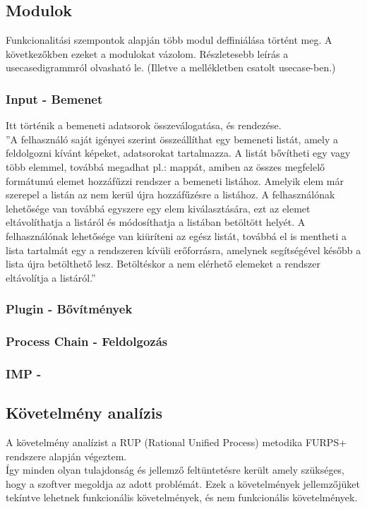 \documentclass[a4paper,12pt,oneside]{report}
\begin{document}
\subsection{Modulok}
Funkcionalitási szempontok alapján több modul deffiniálása történt meg. A következőkben ezeket a modulokat vázolom. Részletesebb leírás a usecasedigrammról olvasható le. (Illetve a mellékletben csatolt usecase-ben.)

\subsubsection{Input - Bemenet}
Itt történik a bemeneti adatsorok összeválogatása, és rendezése.\\
''A felhasználó saját igényei szerint összeállíthat egy bemeneti listát, amely a feldolgozni kívánt képeket, adatsorokat tartalmazza. A listát bővítheti egy vagy több elemmel, továbbá megadhat pl.: mappát, amiben az összes megfelelő formátumú elemet hozzáfűzzi rendszer a bemeneti listához. Amelyik elem már szerepel a listán az nem kerül újra hozzáfűzésre a listához. A felhasználónak lehetősége van továbbá egyszere egy elem kiválasztására, ezt az elemet eltávolíthatja a listáról és módosíthatja a listában betöltött helyét. A felhasználónak lehetősége van kiüríteni az egész listát, továbbá el is mentheti a lista tartalmát egy a rendszeren kívüli erőforrásra, amelynek segítségével később a lista újra betölthető lesz. Betöltéskor a nem elérhető elemeket a rendszer eltávolítja a listáról.''
\subsubsection{Plugin - Bővítmények}

\subsubsection{Process Chain - Feldolgozás}

\subsubsection{IMP - }


\subsection{Követelmény analízis}
A követelmény analízist a RUP (Rational Unified Process) metodika FURPS+ rendszere alapján végeztem.\\Így minden olyan tulajdonság és jellemző feltüntetésre került amely szükséges, hogy a szoftver megoldja az adott problémát. \cite{website:soft_req_def} Ezek a követelmények jellemzőjüket tekíntve lehetnek funkcionális követelmények, és nem funkcionális követelmények.
\end{document}
